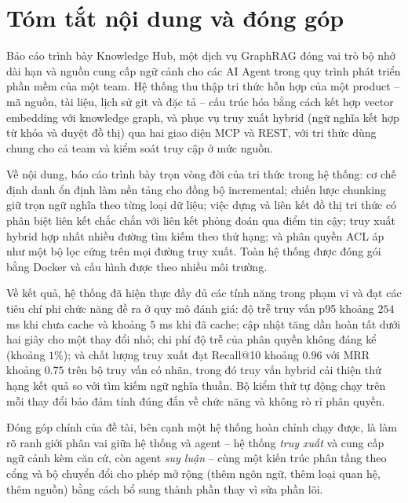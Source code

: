 \section*{Tóm tắt nội dung và đóng góp}

Báo cáo trình bày Knowledge Hub, một dịch vụ GraphRAG đóng vai trò bộ nhớ dài hạn và nguồn cung cấp ngữ cảnh cho các AI Agent trong quy trình phát triển phần mềm của một team. Hệ thống thu thập tri thức hỗn hợp của một product -- mã nguồn, tài liệu, lịch sử git và đặc tả -- cấu trúc hóa bằng cách kết hợp vector embedding với knowledge graph, và phục vụ truy xuất hybrid (ngữ nghĩa kết hợp từ khóa và duyệt đồ thị) qua hai giao diện MCP và REST, với tri thức dùng chung cho cả team và kiểm soát truy cập ở mức nguồn.

Về nội dung, báo cáo trình bày trọn vòng đời của tri thức trong hệ thống: cơ chế định danh ổn định làm nền tảng cho đồng bộ incremental; chiến lược chunking giữ trọn ngữ nghĩa theo từng loại dữ liệu; việc dựng và liên kết đồ thị tri thức có phân biệt liên kết chắc chắn với liên kết phỏng đoán qua điểm tin cậy; truy xuất hybrid hợp nhất nhiều đường tìm kiếm theo thứ hạng; và phân quyền ACL áp như một bộ lọc cứng trên mọi đường truy xuất. Toàn hệ thống được đóng gói bằng Docker và cấu hình được theo nhiều môi trường.

Về kết quả, hệ thống đã hiện thực đầy đủ các tính năng trong phạm vi và đạt các tiêu chí phi chức năng đề ra ở quy mô đánh giá: độ trễ truy vấn p95 khoảng $254$ ms khi chưa cache và khoảng $5$ ms khi đã cache; cập nhật tăng dần hoàn tất dưới hai giây cho một thay đổi nhỏ; chi phí độ trễ của phân quyền không đáng kể (khoảng $1\%$); và chất lượng truy xuất đạt Recall@10 khoảng $0.96$ với MRR khoảng $0.75$ trên bộ truy vấn có nhãn, trong đó truy vấn hybrid cải thiện thứ hạng kết quả so với tìm kiếm ngữ nghĩa thuần. Bộ kiểm thử tự động chạy trên mỗi thay đổi bảo đảm tính đúng đắn về chức năng và không rò rỉ phân quyền.

Đóng góp chính của đề tài, bên cạnh một hệ thống hoàn chỉnh chạy được, là làm rõ ranh giới phân vai giữa hệ thống và agent -- hệ thống \textit{truy xuất} và cung cấp ngữ cảnh kèm căn cứ, còn agent \textit{suy luận} -- cùng một kiến trúc phân tầng theo cổng và bộ chuyển đổi cho phép mở rộng (thêm ngôn ngữ, thêm loại quan hệ, thêm nguồn) bằng cách bổ sung thành phần thay vì sửa phần lõi.
